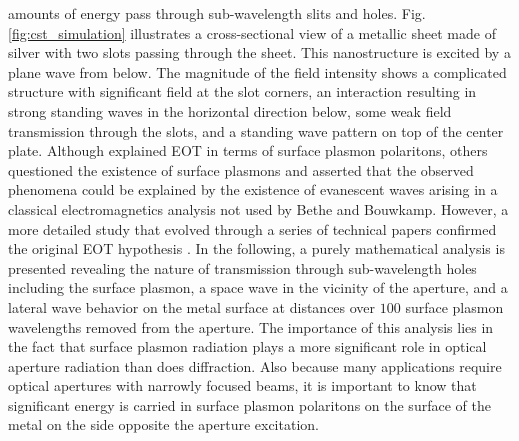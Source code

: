 amounts of energy pass through sub-wavelength slits and holes. Fig. \ref{fig:cst_simulation} illustrates a cross-sectional view of a metallic sheet made of silver with two slots passing through the sheet. This nanostructure is excited by a plane wave from below. The magnitude of the field intensity shows a complicated structure with significant field at the slot corners, an interaction resulting in strong standing waves in the horizontal direction below, some weak field transmission through the slots, and a standing wave pattern on top of the center plate.
Although \cite{Ebbesen1998} explained EOT in terms of surface plasmon polaritons, others \cite{Lezec2004,Gay2006} questioned the existence of surface plasmons and asserted that the observed phenomena could be explained by the existence of evanescent waves arising in a classical electromagnetics analysis not used by Bethe and Bouwkamp. However, a more detailed study that evolved through a series of technical papers confirmed the original EOT hypothesis \cite{Lalanne2006,Nevels2014}. In the following, a purely mathematical analysis is presented revealing the nature of transmission through sub-wavelength holes including the surface plasmon, a space wave in the vicinity of the aperture, and a lateral wave behavior on the metal surface at distances over $100$ surface plasmon wavelengths removed from the aperture. The importance of this analysis lies in the fact that surface plasmon radiation plays a more significant role in optical aperture radiation than does diffraction. Also because many applications require optical apertures with narrowly focused beams, it is important to know that significant energy is carried in surface plasmon polaritons on the surface of the metal on the side opposite the aperture excitation.

